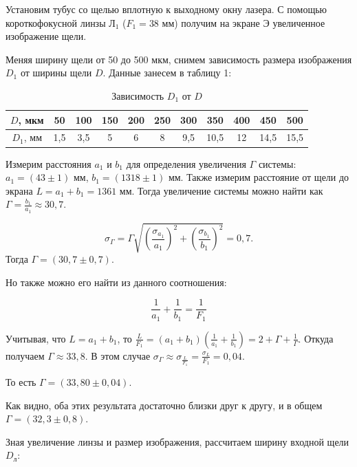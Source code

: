 \documentclass[a4paper,12pt]{article} %
\begin{document}
	Установим тубус со щелью вплотную к выходному окну лазера. С помощью короткофокусной линзы Л$_1$ ($F_1 = 38$ мм) получим на экране Э увеличенное изображение щели.
	
	Меняя ширину щели от 50 до 500 мкм, снимем зависимость размера изображения $D_1$ от ширины щели $D$. Данные занесем в таблицу 1:
	
	\begin{table}[h!]
		\centering
		\begin{tabular}{|c|c|c|c|c|c|c|c|c|c|c|}
			\hline
			$D$, мкм  & 50 & 100 & 150 & 200 & 250 & 300 & 350 & 400 & 450  & 500  \\ \hline
			$D_1$, мм & 1,5  & 3,5 & 5   & 6   & 8   & 9,5   & 10,5   & 12  & 14,5 & 15,5 \\ \hline
		\end{tabular}
	\caption{Зависимость $D_1$ от $D$}
	\end{table}

	Измерим расстояния $a_1$ и $b_1$ для определения увеличения $\Gamma$ системы: $a_1 = (43 \pm 1)$ мм, $b_1 = (1318 \pm 1)$ мм. Также измерим расстояние от щели до экрана $L = a_1 + b_1 = 1361$ мм. Тогда увеличение системы можно найти как $\Gamma = \frac{b_1}{a_1} \approx 30,7$. 
	
	\begin{equation*}
		\sigma_\Gamma = \Gamma\sqrt{\left(\frac{\sigma_{a_1}}{a_1}\right)^2 + \left(\frac{\sigma_{b_1}}{b_1}\right)^2} = 0,7.
	\end{equation*}
	Тогда $\Gamma = (30,7 \pm 0,7)$.
	
	Но также можно его найти из данного соотношения:
	
	\begin{equation*}
		\frac{1}{a_1} + \frac{1}{b_1} = \frac{1}{F_1}
	\end{equation*}

	Учитывая, что $L = a_1 + b_1$, то $\frac{L}{F_1} = \left(a_1 + b_1\right)\left(\frac{1}{a_1} + \frac{1}{b_1}\right) = 2 + \Gamma + \frac{1}{\Gamma}$. Откуда получаем $\Gamma \approx 33,8$.
	В этом случае $\sigma_\Gamma \approx \sigma_{\frac{L}{F_1}} = \frac{\sigma_L}{F_1} = 0,04$.
	
	\noindent То есть $\Gamma = (33,80 \pm 0,04)$.
	
	Как видно, оба этих результата достаточно близки друг к другу, и в общем $\Gamma = (32,3 \pm 0,8)$.
	
	Зная увеличение линзы и размер изображения, рассчитаем ширину входной щели $D_{\text{л}}$:
	
\end{document}
